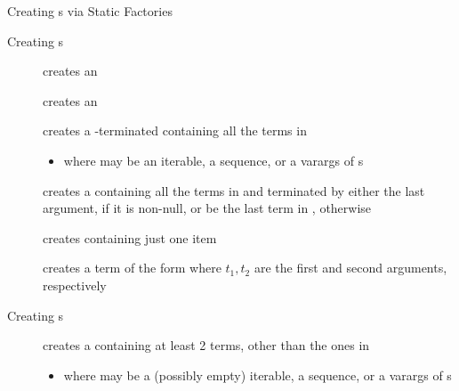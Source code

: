 \documentclass[handout]{beamer}
\begin{document}
\begin{frame}[allowframebreaks]{Creating s via Static Factories}
    \begin{block}{Creating s}
        \begin{description}
            \item[] creates an 

            \item[] creates an 

            \item[] creates a \kt{[]}-terminated  containing all the terms in 
            \begin{itemize}\small
                \item where  may be an iterable, a sequence, or a varargs of s
            \end{itemize}

            \item[] creates a  containing all the terms in  and terminated by either the last argument, if it is non-null, or be the last term in , otherwise

            \item[] creates  containing just one item

            \item[] creates a term of the form  where $t_1,t_2$ are the first and second arguments, respectively
        \end{description}
    \end{block}

    \framebreak


    \framebreak

    \begin{block}{Creating s}
        \begin{description}
            \item[] creates a  containing at least 2 terms, other than the ones in 
            \begin{itemize}\small
                \item where  may be a (possibly empty) iterable, a sequence, or a varargs of s
            \end{itemize}
        \end{description}
    \end{block}


\end{frame}
\end{document}
